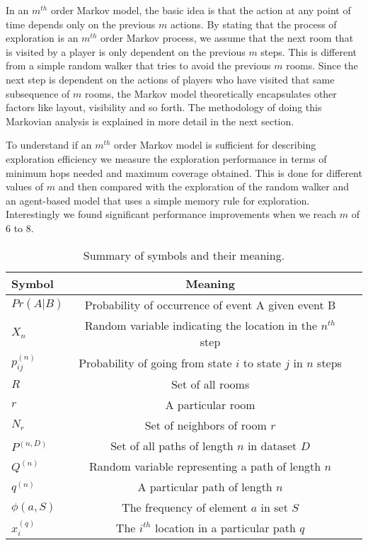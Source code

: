 In an $m^{th}$ order Markov model, the basic idea is that the action at any point of time depends only on the previous $m$ actions. By stating that the process of exploration is an $m^{th}$ order Markov process, we assume that the next room that is visited by a player is only dependent on the previous $m$ steps. This is different from a simple random walker that tries to avoid the previous $m$ rooms. Since the next step is dependent on the actions of players who have visited that same subsequence of $m$ rooms, the Markov model theoretically encapsulates other factors like layout, visibility and so forth. The methodology of doing this Markovian analysis is explained in more detail in the next section.

To understand if an $m^{th}$ order Markov model is sufficient for describing exploration efficiency we measure the exploration performance in terms of minimum hops needed and maximum coverage obtained. This is done for different values of $m$ and then compared with the exploration of the random walker and an agent-based model that uses a simple memory rule for exploration. Interestingly we found significant performance improvements when we reach $m$ of 6 to 8.

\begin{table*}[tbp]
\caption{Summary of symbols and their meaning.}
\label{tab:Symbol_Table}
\begin{tabular}{lcc}\hline

Symbol & Meaning   \\ \hline
$Pr (A|B)$ & Probability of occurrence of event A given event B \\
$X_n$ & Random variable indicating the location in the $n^{th}$ step \\
$p^{(n)}_{ij}$ & Probability of going from state $i$ to state $j$ in $n$ steps \\
$R$ & Set of all rooms \\
$r$ & A particular room \\
$N_r$ & Set of neighbors of room $r$ \\
$P^{(n,D)}$ & Set of all paths of length $n$ in dataset $D$\\
$Q^{(n)}$ & Random variable representing a path of length $n$\\
$q^{(n)}$ & A particular path of length $n$\\
$\phi(a,S)$ & The frequency of element $a$ in set $S$\\
$x^{(q)}_{i}$ & The $i^{th}$ location in a particular path $q$\\

\hline
\end{tabular}
\end{table*}

